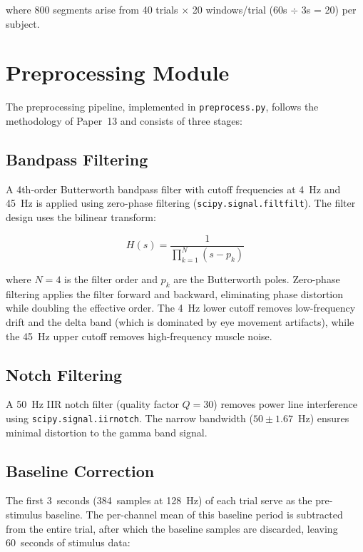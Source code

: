 \documentclass[12pt,a4paper]{report}
\begin{document}
\noindent where 800 segments arise from 40 trials $\times$ 20 windows/trial
(60s $\div$ 3s = 20) per subject.


\section{Preprocessing Module}
\label{sec:preprocess}

The preprocessing pipeline, implemented in \texttt{preprocess.py}, follows the
methodology of Paper~13 and consists of three stages:

\subsection{Bandpass Filtering}

A 4th-order Butterworth bandpass filter with cutoff frequencies at 4~Hz and
45~Hz is applied using zero-phase filtering (\texttt{scipy.signal.filtfilt}).
The filter design uses the bilinear transform:

\begin{equation}
    H(s) = \frac{1}{\prod_{k=1}^{N}(s - p_k)}
    \label{eq:butterworth}
\end{equation}

\noindent where $N=4$ is the filter order and $p_k$ are the Butterworth poles.
Zero-phase filtering applies the filter forward and backward, eliminating phase
distortion while doubling the effective order. The 4~Hz lower cutoff removes
low-frequency drift and the delta band (which is dominated by eye movement
artifacts), while the 45~Hz upper cutoff removes high-frequency muscle noise.

\subsection{Notch Filtering}

A 50~Hz IIR notch filter (quality factor $Q=30$) removes power line
interference using \texttt{scipy.signal.iirnotch}. The narrow bandwidth
($50 \pm 1.67$~Hz) ensures minimal distortion to the gamma band signal.

\subsection{Baseline Correction}

The first 3~seconds (384~samples at 128~Hz) of each trial serve as the
pre-stimulus baseline. The per-channel mean of this baseline period is
subtracted from the entire trial, after which the baseline samples are
discarded, leaving 60~seconds of stimulus data:
\end{document}
